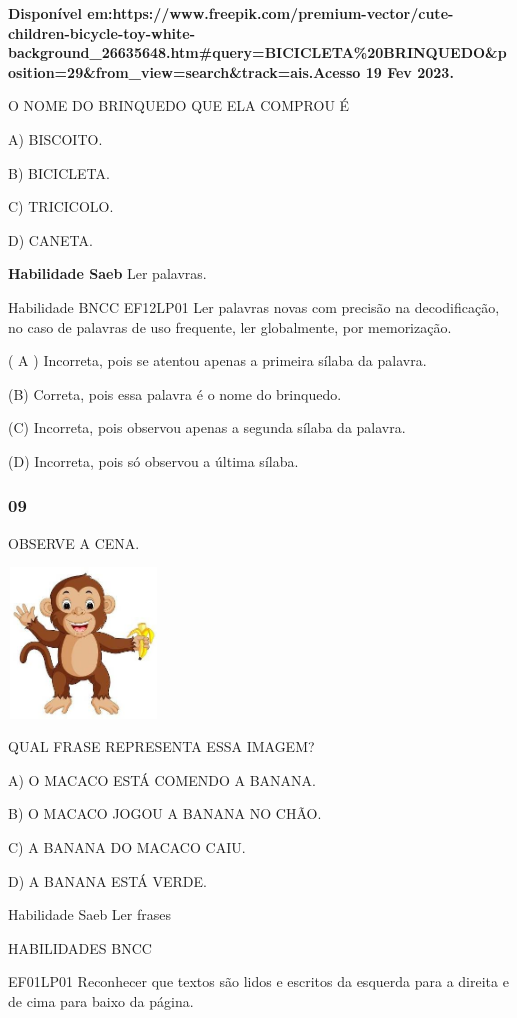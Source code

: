 \begin{escola}
\textbf{Disponível
em:https://www.freepik.com/premium-vector/cute-children-bicycle-toy-white-background\_26635648.htm\#query=BICICLETA\%20BRINQUEDO\&position=29\&from\_view=search\&track=ais.Acesso
19 Fev 2023.}

O NOME DO BRINQUEDO QUE ELA COMPROU É

A) BISCOITO.

B) BICICLETA.

C) TRICICOLO.

D) CANETA.

\textbf{Habilidade Saeb} Ler palavras.

Habilidade BNCC EF12LP01 Ler palavras novas com precisão na
decodificação, no caso de palavras de uso frequente, ler globalmente,
por memorização.

\protect\hypertarget{_heading=h.3tbugp1}{}{}( A ) Incorreta, pois se
atentou apenas a primeira sílaba da palavra.

(B) Correta, pois essa palavra é o nome do brinquedo.

(C) Incorreta, pois observou apenas a segunda sílaba da palavra.

(D) Incorreta, pois só observou a última sílaba.

\subsubsection{09}\label{section-49}

OBSERVE A CENA.

\includegraphics[width=1.57569in,height=1.57569in]{media/image218.jpg}

QUAL FRASE REPRESENTA ESSA IMAGEM?

A) O MACACO ESTÁ COMENDO A BANANA.

B) O MACACO JOGOU A BANANA NO CHÃO.

C) A BANANA DO MACACO CAIU.

D) A BANANA ESTÁ VERDE.

Habilidade Saeb Ler frases

HABILIDADES BNCC

EF01LP01 Reconhecer que textos são lidos e escritos da esquerda para a
direita e de cima para baixo da página.


\end{escola}
